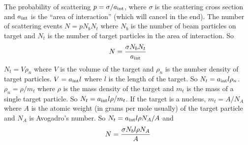 \documentclass{article}
\begin{document}
The probability of scattering $p = \sigma/a_{\rm int}$, where $\sigma$ is the scattering cross section and $a_{\rm int}$ is the ``area of interaction'' (which will cancel in the end). The number of scattering events $N=pN_bN_t$ where $N_b$ is the number of beam particles on target and $N_t$ is the number of target particles in the area of interaction. So
$$
N = {\sigma N_b N_t \over a_{\rm int}}
$$
  $N_t = V\rho_n$ where $V$ is the volume of the target and $\rho_n$ is the number density of target particles. $V=a_{\rm int}l$ where $l$ is the length of the target. So $N_t = a_{\rm int}l\rho_n$. $\rho_n = \rho/m_t$ where $\rho$ is the mass density of the target and $m_t$ is the mass of a single target particle. So $N_t = a_{\rm int}l\rho/m_t$. If the target is a nucleus, $m_t = A/N_A$ where $A$ is the atomic weight (in grams per mole usually) of the target particle and $N_A$ is Avogadro's number. So $N_t = a_{\rm int}l\rho N_A/A$ and 
  $$
  N = {\sigma N_b l \rho N_A \over A}
  $$
\end{document}
